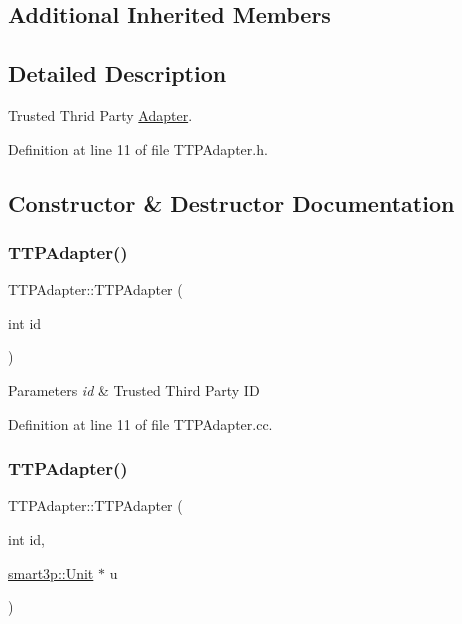 \subsection*{Additional Inherited Members}


\subsection{Detailed Description}
Trusted Thrid Party \hyperlink{classAdapter}{Adapter}. 

Definition at line 11 of file T\+T\+P\+Adapter.\+h.



\subsection{Constructor \& Destructor Documentation}
\mbox{\label{classTTPAdapter_a47fcddf78f8e0b494fe2f6a79f16c762}} 
\subsubsection{\texorpdfstring{T\+T\+P\+Adapter()}{TTPAdapter()}\hspace{0.1cm}{\footnotesize\ttfamily [1/2]}}
{\footnotesize\ttfamily T\+T\+P\+Adapter\+::\+T\+T\+P\+Adapter (\begin{DoxyParamCaption}\item[{int}]{id }\end{DoxyParamCaption})}


\begin{DoxyParams}{Parameters}
{\em id} & Trusted Third Party ID \\
\hline
\end{DoxyParams}


Definition at line 11 of file T\+T\+P\+Adapter.\+cc.

\mbox{\label{classTTPAdapter_a2c64e6c544cf9aa5e715ecb91bae2baa}} 
\subsubsection{\texorpdfstring{T\+T\+P\+Adapter()}{TTPAdapter()}\hspace{0.1cm}{\footnotesize\ttfamily [2/2]}}
{\footnotesize\ttfamily T\+T\+P\+Adapter\+::\+T\+T\+P\+Adapter (\begin{DoxyParamCaption}\item[{int}]{id,  }\item[{\hyperlink{classsmart3p_1_1Unit}{smart3p\+::\+Unit} $\ast$}]{u }\end{DoxyParamCaption})}


